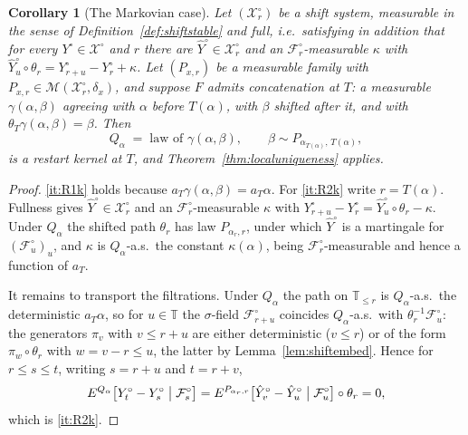 \documentclass[11pt,a4paper]{article}
\theoremstyle{plain}
\newtheorem{corollary}[theorem]{Corollary}
\theoremstyle{definition}
\theoremstyle{remark}
\newcommand{\T}{\mathbb{T}}                     %
\newcommand{\Filt}{\mathcal{F}}
\newcommand{\XX}{\mathcal{X}}                  %
\newcommand{\Msol}{\mathcal{M}}
\begin{document}
\begin{corollary}[The Markovian case]
  \label{cor:pastingmarkov}
  Let $(\XX^\circ_r)$ be a shift system, measurable in the sense of
  Definition~\ref{def:shiftstable} and \emph{full}, i.e.\ satisfying in addition
  that for every $Y^\circ \in \XX^\circ$ and $r$ there are
  $\hat{Y}^\circ \in \XX^\circ_r$ and an $\Filt^\circ_r$-measurable $\kappa$ with
  $\hat{Y}^\circ_u \circ \theta_r = Y^\circ_{r+u} - Y^\circ_r + \kappa$.  Let
  $(P_{x,r})$ be a measurable family with $P_{x,r} \in \Msol(\XX^\circ_r,\delta_x)$,
  and suppose $F$ admits concatenation at $T$: a measurable
  $\gamma(\alpha,\beta)$ agreeing with $\alpha$ before $T(\alpha)$, with
  $\beta$ shifted after it, and with $\theta_T\gamma(\alpha,\beta) = \beta$.  Then
  \[
    Q_\alpha \;=\; \text{law of } \gamma(\alpha,\beta) ,
    \qquad \beta \sim P_{\alpha_{T(\alpha)},\, T(\alpha)} ,
  \]
  is a restart kernel at $T$, and Theorem~\ref{thm:localuniqueness} applies.
\end{corollary}

\begin{proof}
  \ref{it:R1k} holds because $a_T\gamma(\alpha,\beta) = a_T\alpha$.  For
  \ref{it:R2k} write $r = T(\alpha)$.  Fullness gives
  $\hat{Y}^\circ \in \XX^\circ_r$ and an $\Filt^\circ_r$-measurable $\kappa$ with
  $Y^\circ_{r+u} - Y^\circ_r = \hat{Y}^\circ_u \circ \theta_r - \kappa$.  Under
  $Q_\alpha$ the shifted path $\theta_r$ has law $P_{\alpha_r,r}$, under which
  $\hat{Y}^\circ$ is a martingale for $(\Filt^\circ_u)_u$, and $\kappa$ is
  $Q_\alpha$-a.s.\ the constant $\kappa(\alpha)$, being
  $\Filt^\circ_r$-measurable and hence a function of $a_T$.

  It remains to transport the filtrations.  Under $Q_\alpha$ the path on
  $\T_{\leq r}$ is $Q_\alpha$-a.s.\ the deterministic $a_T\alpha$, so for $u \in \T$
  the $\sigma$-field $\Filt^\circ_{r+u}$ coincides $Q_\alpha$-a.s.\ with
  $\theta_r^{-1}\Filt^\circ_u$: the generators $\pi_v$ with $v \leq r+u$ are
  either deterministic ($v \leq r$) or of the form $\pi_w \circ \theta_r$ with
  $w = v - r \leq u$, the latter by Lemma~\ref{lem:shiftembed}.  Hence for
  $r \leq s \leq t$, writing $s = r + u$ and $t = r + v$,
  \[
    E^{Q_\alpha}\bigl[ Y^\circ_t - Y^\circ_s \bigm| \Filt^\circ_s \bigr]
      = E^{P_{\alpha_r,r}}\bigl[ \hat{Y}^\circ_v - \hat{Y}^\circ_u
          \bigm| \Filt^\circ_u \bigr] \circ \theta_r
      = 0 ,
  \]
  which is \ref{it:R2k}.
\end{proof}
\end{document}
